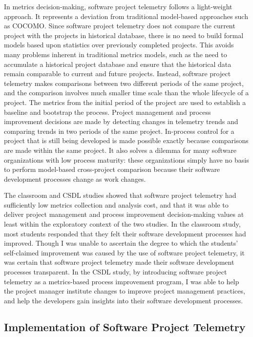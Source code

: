 In metrics decision-making, software project telemetry follows a light-weight approach. It represents a deviation from traditional model-based approaches such as COCOMO. Since software project telemetry does not compare the current project with the projects in historical database, there is no need to build formal models based upon statistics over previously completed projects. This avoids many problems inherent in traditional metrics models, such as the need to accumulate a historical project database and ensure that the historical data remain comparable to current and future projects. Instead, software project telemetry makes comparisons between two different periods of the same project, and the comparison involves much smaller time scale than the whole lifecycle of a project. The metrics from the initial period of the project are used to establish a baseline and bootstrap the process. Project management and process improvement decisions are made by detecting changes in telemetry trends and comparing trends in two periods of the same project. In-process control for a project that is still being developed is made possible exactly because comparisons are made within the same project. It also solves a dilemma for many software organizations with low process maturity: these organizations simply have no basis to perform model-based cross-project comparison because their software development processes change as work changes. 

The classroom and CSDL studies showed that software project telemetry had sufficiently low metrics collection and analysis cost, and that it was able to deliver project management and process improvement decision-making values at least within the exploratory context of the two studies.
In the classroom study, most students responded that they felt their software development processes had improved. Though I was unable to ascertain the degree to which the students' self-claimed improvement was caused by the use of software project telemetry, it was certain that software project telemetry made their software development processes transparent. 
In the CSDL study, by introducing software project telemetry as a metrics-based process improvement program, I was able to help the project manager institute changes to improve project management practices, and help the developers gain insights into their software development processes.







\subsection{Implementation of Software Project Telemetry}

